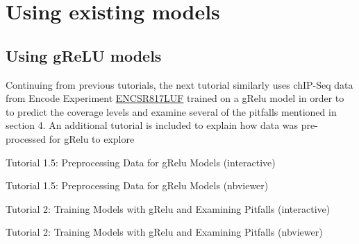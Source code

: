 \documentclass[
]{book}
\begin{document}
\part{Using existing models}\label{part-using-existing-models}

\chapter{Using gReLU models}\label{using-grelu-models}

Continuing from previous tutorials, the next tutorial similarly uses chIP-Seq data from Encode Experiment \href{https://www.encodeproject.org/experiments/ENCSR817LUF/}{ENCSR817LUF} trained on a gRelu model in order to to predict the coverage levels and examine several of the pitfalls mentioned in section 4. An additional tutorial is included to explain how data was pre-processed for gRelu to explore

Tutorial 1.5: Preprocessing Data for gRelu Models (interactive)

Tutorial 1.5: Preprocessing Data for gRelu Models (nbviewer)

Tutorial 2: Training Models with gRelu and Examining Pitfalls (interactive)

Tutorial 2: Training Models with gRelu and Examining Pitfalls (nbviewer)

  
\end{document}
